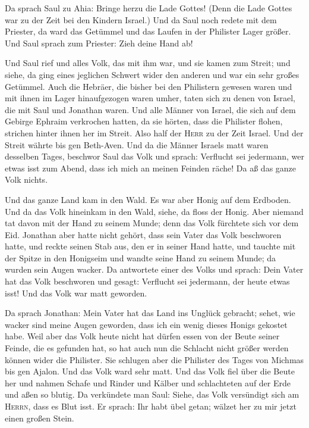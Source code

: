  Da sprach Saul zu Ahia: Bringe herzu die Lade Gottes!
(Denn die Lade Gottes war zu der Zeit bei den Kindern Israel.)
 Und da Saul noch redete mit dem Priester, da ward das
Getümmel und das Laufen in der Philister Lager größer. Und Saul sprach
zum Priester: Zieh deine Hand ab!

 Und Saul rief und alles Volk, das mit ihm war, und sie
kamen zum Streit; und siehe, da ging eines jeglichen Schwert wider den
anderen und war ein sehr großes Getümmel.  Auch die
Hebräer, die bisher bei den Philistern gewesen waren und mit ihnen im
Lager hinaufgezogen waren umher, taten sich zu denen von Israel, die mit
Saul und Jonathan waren.  Und alle Männer von Israel, die
sich auf dem Gebirge Ephraim verkrochen hatten, da sie hörten, dass die
Philister flohen, strichen hinter ihnen her im Streit. 
Also half der \textsc{Herr} zu der Zeit Israel. Und der Streit währte
bis gen Beth-Aven.  Und da die Männer Israels matt waren
desselben Tages, beschwor Saul das Volk und sprach: Verflucht sei
jedermann, wer etwas isst zum Abend, dass ich mich an meinen Feinden
räche! Da aß das ganze Volk nichts.

 Und das ganze Land kam in den Wald. Es war aber Honig
auf dem Erdboden.  Und da das Volk hineinkam in den Wald,
siehe, da floss der Honig. Aber niemand tat davon mit der Hand zu seinem
Munde; denn das Volk fürchtete sich vor dem Eid. 
Jonathan aber hatte nicht gehört, dass sein Vater das Volk beschworen
hatte, und reckte seinen Stab aus, den er in seiner Hand hatte, und
tauchte mit der Spitze in den Honigseim und wandte seine Hand zu seinem
Munde; da wurden sein Augen wacker.  Da antwortete einer
des Volks und sprach: Dein Vater hat das Volk beschworen und gesagt:
Verflucht sei jedermann, der heute etwas isst! Und das Volk war matt
geworden.

 Da sprach Jonathan: Mein Vater hat das Land ins Unglück
gebracht; sehet, wie wacker sind meine Augen geworden, dass ich ein
wenig dieses Honigs gekostet habe.  Weil aber das Volk
heute nicht hat dürfen essen von der Beute seiner Feinde, die es
gefunden hat, so hat auch nun die Schlacht nicht größer werden können
wider die Philister.  Sie schlugen aber die Philister des
Tages von Michmas bis gen Ajalon. Und das Volk ward sehr matt.
 Und das Volk fiel über die Beute her und nahmen Schafe
und Rinder und Kälber und schlachteten auf der Erde und aßen so blutig.
 Da verkündete man Saul: Siehe, das Volk versündigt sich
am \textsc{Herrn}, dass es Blut isst. Er sprach: Ihr habt übel getan;
wälzet her zu mir jetzt einen großen Stein.


